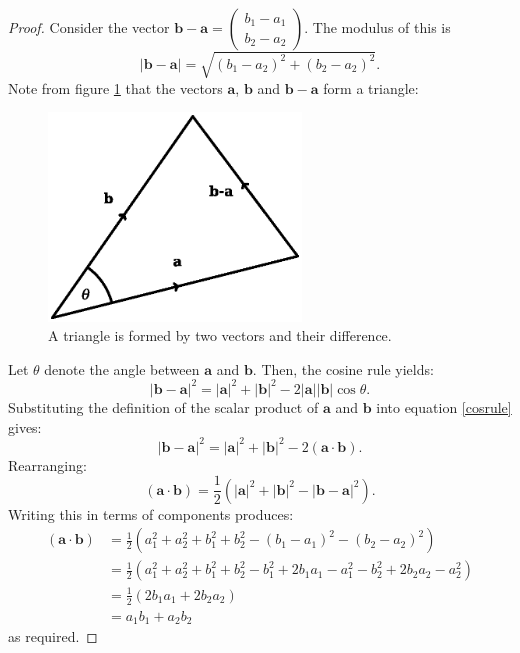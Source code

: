 \documentclass[12pt,a4paper]{article}
\theoremstyle{definition}
\theoremstyle{remark}
\newcommand{\bvec}[1]{\mathrm{\mathbf{#1}}}
\newcommand{\cvec}[2]{\begin{pmatrix} #1 \\ #2 \end{pmatrix}}
\newcommand{\vmod}[1]{{\lvert {#1} \rvert}}
\begin{document}
\begin{proof}
Consider the vector \(\bvec{b} - \bvec{a} = \cvec{b_1 - a_1}{b_2 - a_2}\). The modulus of this is
\[
\vmod{\bvec{b} - \bvec{a}} = \sqrt{(b_1 - a_2)^2 + (b_2 - a_2)^2}.
\] 
Note from figure \ref{triangle} that the vectors \(\bvec{a}\), \(\bvec{b}\) and \(\bvec{b}-\bvec{a}\) form a triangle: 
\begin{figure}[!h]
\begin{center}
\includegraphics[width=0.6\textwidth]{triangle.eps}
\end{center}
\caption{A triangle is formed by two vectors and their difference.}
\label{triangle}
\end{figure}

Let \(\theta\) denote the angle between \(\bvec{a}\) and \(\bvec{b}\). Then, the cosine rule yields:
\begin{equation}
\label{cosrule}
{\vmod{\bvec{b}-\bvec{a}}}^2 = {\vmod{\bvec{a}}}^2 + {\vmod{\bvec{b}}}^2 - 2\vmod{\bvec{a}}\vmod{\bvec{b}}\cos\theta. 
\end{equation} 
Substituting the definition of the scalar product of \(\bvec{a}\) and \(\bvec{b}\) into equation \ref{cosrule} gives:
\[
{\vmod{\bvec{b}-\bvec{a}}}^2 = {\vmod{\bvec{a}}}^2 + {\vmod{\bvec{b}}}^2 - 2\left(\bvec{a}\cdot \bvec{b}\right).
\] 
Rearranging:
\[
\left(\bvec{a}\cdot \bvec{b}\right) = \frac{1}{2}\left({\vmod{\bvec{a}}}^2 + {\vmod{\bvec{b}}}^2 - {\vmod{\bvec{b}-\bvec{a}}}^2\right).
\]
Writing this in terms of components produces:
\begin{align*}
\left(\bvec{a}\cdot \bvec{b}\right) &= \frac{1}{2}\left(a_1^2 + a_2^2 + b_1^2 + b_2^2 - (b_1 - a_1)^2 - (b_2 - a_2)^2\right)\\
\,&=\frac{1}{2}\left(a_1^2 + a_2^2 + b_1^2 + b_2^2 - b_1^2 + 2b_1a_1 - a_1^2 - b_2^2 + 2b_2a_2 - a_2^2\right)\\
\,&=\frac{1}{2}\left(2b_1a_1 + 2b_2a_2\right)\\
\,&=a_1b_1 + a_2b_2
\end{align*}
as required. 
\end{proof}
\end{document}
